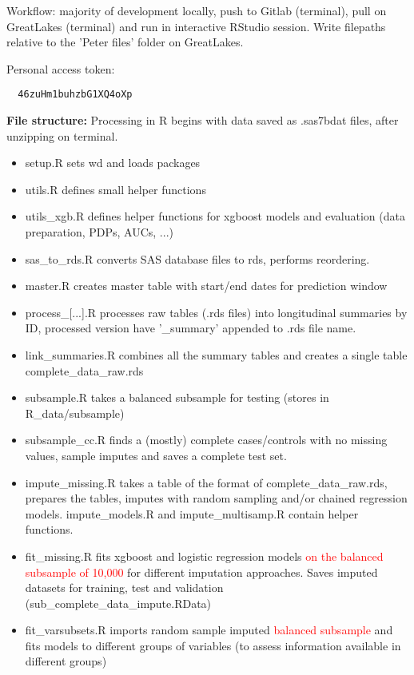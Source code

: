 \documentclass[12pt]{article}
\newcommand{\note}[1]{\textcolor{red}{#1}}
\begin{document}
Workflow: majority of development locally, push to Gitlab (terminal), pull on GreatLakes (terminal) and run in interactive RStudio session. Write filepaths relative to the 'Peter files' folder on GreatLakes.

Personal access token:
\begin{verbatim}
  46zuHm1buhzbG1XQ4oXp
\end{verbatim}

{\bf File structure:}
Processing in R begins with data saved as .sas7bdat files, after unzipping on terminal.
\begin{itemize}
  \item setup.R sets wd and loads packages
  \item utils.R defines small helper functions
  \item utils\_xgb.R defines helper functions for xgboost models and evaluation (data preparation, PDPs, AUCs, ...)
  \item sas\_to\_rds.R converts SAS database files to rds, performs reordering.
  \item master.R creates master table with start/end dates for prediction window
  \item process\_[...].R processes raw tables (.rds files) into longitudinal summaries by ID, processed version have '\_summary' appended to .rds file name.
  \item link\_summaries.R combines all the summary tables and creates a single table complete\_data\_raw.rds
  \item subsample.R takes a balanced subsample for testing (stores in R\_data/subsample)
  \item subsample\_cc.R finds a (mostly) complete cases/controls with no missing values, sample imputes and saves a complete test set.
  \item impute\_missing.R takes a table of the format of complete\_data\_raw.rds, prepares the tables, imputes with random sampling and/or chained regression models. impute\_models.R and impute\_multisamp.R contain helper functions.
  \item fit\_missing.R fits xgboost and logistic regression models \note{on the balanced subsample of 10,000} for different imputation approaches. Saves imputed datasets for training, test and validation (sub\_complete\_data\_impute.RData)
  \item fit\_varsubsets.R imports random sample imputed \note{balanced subsample} and fits models to different groups of variables (to assess information available in different groups)
\end{itemize}
\end{document}
